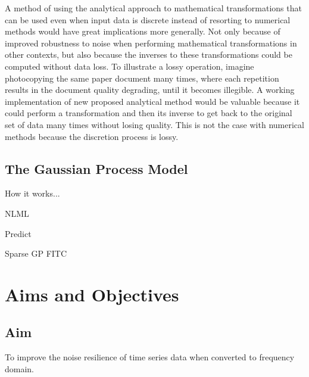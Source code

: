 \documentclass[12pt]{article}
\begin{document}
    A method of using the analytical approach to mathematical transformations that can be used even when input data is discrete instead of resorting to numerical methods would have great implications more generally.
    Not only because of improved robustness to noise when performing mathematical transformations in other contexts, but also because  the inverses to these transformations could be computed without data loss.
    To illustrate a lossy operation, imagine photocopying the same paper document many times, where each repetition results in the document quality degrading, until it becomes illegible.
    A working implementation of new proposed analytical method would be valuable because it could perform a transformation and then its inverse to get back to the original set of data many times without losing quality.
    This is not the case with numerical methods because the discretion process is lossy.

    \subsection{The Gaussian Process Model}
    How it works...

    NLML

    Predict

    Sparse GP
        FITC


    \section{Aims and Objectives}
    \subsection{Aim}
    To improve the noise resilience of time series data when converted to frequency domain.
\end{document}
